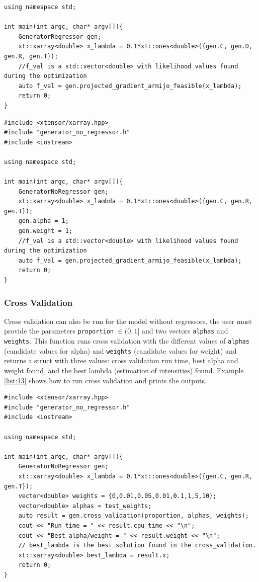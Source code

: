 \documentclass[article]{jss}
\begin{document}
{\begin{lstlisting}[label={list:11},caption=Calibration of the model with regressors in \proglang{C++}]
using namespace std;

int main(int argc, char* argv[]){
    GeneratorRegressor gen;
    xt::xarray<double> x_lambda = 0.1*xt::ones<double>({gen.C, gen.D, gen.R, gen.T});
    //f_val is a std::vector<double> with likelihood values found during the optimization
    auto f_val = gen.projected_gradient_armijo_feasible(x_lambda);
    return 0;
}
\end{lstlisting}


\begin{lstlisting}[label={list:12},caption=Calibration of the model without regressors in \proglang{C++}]
#include <xtensor/xarray.hpp>
#include "generator_no_regressor.h"
#include <iostream>

using namespace std;

int main(int argc, char* argv[]){
    GeneratorNoRegressor gen;
    xt::xarray<double> x_lambda = 0.1*xt::ones<double>({gen.C, gen.R, gen.T});
    gen.alpha = 1;
    gen.weight = 1;
    //f_val is a std::vector<double> with likelihood values found during the optimization
    auto f_val = gen.projected_gradient_armijo_feasible(x_lambda);
    return 0;
}

\end{lstlisting}


\subsubsection{Cross Validation}

Cross validation can also be run
for the model without regressors.
the user must provide the parameters {\tt{proportion}} \(\in (0,1]\) and two vectors {\tt{alphas}} and {\tt{weights}}. This function runs cross validation with the different
values of {\tt{alphas}} (candidate values for alpha) and {\tt{weights}} 
(candidate values for weight) and returns a struct with three values: cross validation run time, best alpha and weight found, and the best lambda (estimation of intensities) found. Example \ref{list:13} shows how to run cross validation and prints the outputs.


\begin{lstlisting}[label={list:13},caption=Cross validation in \proglang{C++}]
#include <xtensor/xarray.hpp>
#include "generator_no_regressor.h"
#include <iostream>

using namespace std;

int main(int argc, char* argv[]){
    GeneratorNoRegressor gen;
    xt::xarray<double> x_lambda = 0.1*xt::ones<double>({gen.C, gen.R, gen.T});
    vector<double> weights = {0,0.01,0.05,0.01,0.1,1,5,10};
    vector<double> alphas = test_weights;
    auto result = gen.cross_validation(proportion, alphas, weights);
    cout << "Run time = " << result.cpu_time << "\n";
    cout << "Best alpha/weight = " << result.weight << "\n";
    // best_lambda is the best solution found in the cross_validation.
    xt::xarray<double> best_lambda = result.x;
    return 0;
}


\end{lstlisting}}
\end{document}
